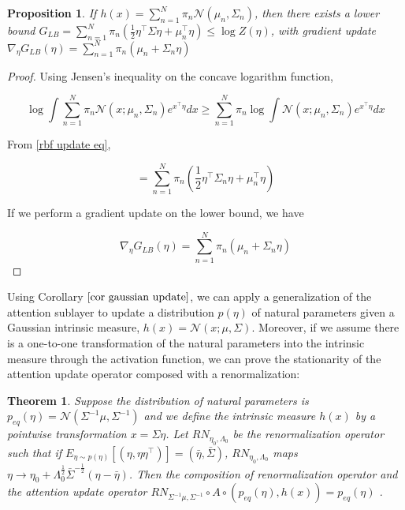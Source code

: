 \documentclass{article}
\newtheorem{theorem}{Theorem}
\newtheorem{proposition}{Proposition}
\begin{document}
\begin{proposition}
  If $h(x) = \sum_{n=1}^N \pi_n \mathcal{N} \left( \mu_n, \Sigma_n \right)$, then there exists a lower bound $G_{LB} = \sum_{n=1}^N \pi_n \left( \frac{1}{2} \eta^\intercal \Sigma \eta + \mu_n^\intercal \eta \right) \leq \log Z(\eta)$, with gradient update $\nabla_\eta G_{LB}(\eta) = \sum_{n=1}^N \pi_n ( \mu_n + \Sigma_n \eta )$
  \label{}
\end{proposition}

\begin{proof}
  Using Jensen's inequality on the concave logarithm function,

  \begin{equation}
    \log \int \sum_{n=1}^N \pi_n \mathcal{N} \left( x; \mu_n, \Sigma_n \right) e^{ x^\intercal \eta} dx \geq \sum_{n=1}^N \pi_n \log \int \mathcal{N} ( x; \mu_n, \Sigma_n ) e^{ x^\intercal \eta} dx
    \label{Jensen's inequality}
  \end{equation}

  From \eqref{rbf update eq}, 

  \begin{equation}
    = \sum_{n=1}^N \pi_n \left( \frac{1}{2} \eta^\intercal \Sigma_n \eta + \mu_n^\intercal \eta \right)
    \label{lower bound}
  \end{equation}

  If we perform a gradient update on the lower bound, we have
  
  \begin{equation}
    \nabla_\eta G_{LB}(\eta) = \sum_{n=1}^N \pi_n ( \mu_n + \Sigma_n \eta )
    \label{lower bound update}
  \end{equation}

\end{proof}

Using Corollary $\autoref{cor gaussian update}$, we can apply a generalization of the attention sublayer to update a distribution $p(\eta)$ of natural parameters given a Gaussian intrinsic measure, $h(x) = \mathcal{N}(x;\mu,\Sigma)$. Moreover, if we assume there is a one-to-one transformation of the natural parameters into the intrinsic measure through the activation function, we can prove the stationarity of the attention update operator composed with a renormalization:

\begin{theorem}
  Suppose the distribution of natural parameters is $p_{eq}(\eta) = \mathcal{N}( \Sigma^{-1} \mu, \Sigma^{-1} )$ and we define the intrinsic measure $h(x)$ by a pointwise transformation $ x = \Sigma \eta$. Let $RN_{\eta_0,\Lambda_0}$ be the renormalization operator such that if $E_{ \eta \sim p(\eta) } \left[ ( \eta, \eta \eta^\intercal ) \right] = (\bar{\eta}, \bar{\Sigma}) $, $RN_{\eta_0,\Lambda_0}$ maps $\eta \rightarrow \eta_0 + \Lambda_0^{\frac{1}{2}}\bar{\Sigma}^{-\frac{1}{2}} (\eta - \bar{\eta})$. 
  Then the composition of renormalization operator and the attention update operator $RN_{\Sigma^{-1}\mu,\Sigma^{-1}} \circ A \circ ( p_{eq}(\eta), h(x) ) = p_{eq}(\eta)$ . 
  \label{theorem equilibrium}
\end{theorem}
\end{document}
